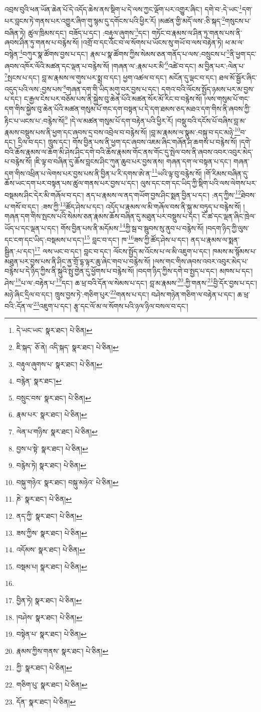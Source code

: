 འབྲས་བུའི་ཕན་ཡོན་ཆེན་པོ་དེ་འདོད་ཆེས་ནས་སྡིག་པ་དེ་ལས་ཀྱང་ལྡོག་པར་འགྱུར་ཞིང་། དགེ་བ་:དེ་ཡང་\footnote{དེ་ཡང་ཡང་  སྣར་ཐང་།  པེ་ཅིན། }དག་པར་བླངས་ཏེ་གནས་པར་འགྱུར་ཞིག་གུ་སྙམ་དུ་དགོངས་པའི་ཕྱིར་རོ། །མཚན་གྱི་མདོ་ལས་:ཅི་སྐད་\footnote{ཇི་སྐད་  ཅོ་ནེ། འདི་སྐད་  སྣར་ཐང་།  པེ་ཅིན། }གསུངས་པ་བཞིན་ཏེ། ཚུལ་ཁྲིམས་དང་། བཟོད་པ་དང་། :བརྟུལ་ཞུགས་\footnote{བརྟུལ་ཞུགས་པ་  སྣར་ཐང་།  པེ་ཅིན། }དང་། གཏོང་བ་རྣམས་ལ་ཤིན་ཏུ་གནས་པས་ནི་ཞབས་ཤིན་ཏུ་གནས་པ་བརྙེས་སོ། །འགྲོ་བ་དང་འོང་བ་ལ་སོགས་པ་ཡོངས་སུ་གཡོ་བ་ལས་བརྟེན་ཏེ། ཕ་མ་ལ་བསྙེན་\footnote{བརྙེན་  སྣར་ཐང་། }བཀུར་སྣ་ཚོགས་བྱས་པ་དང་། རྣམ་པ་སྣ་ཚོགས་ཀྱིས་སེམས་ཅན་གནོད་པ་ལས་:བསྲུངས་པ་\footnote{བསྲུང་བས་  སྣར་ཐང་།  པེ་ཅིན། }ནི་ཕྱག་དང་ཞབས་འཁོར་ལོའི་མཚན་དང་ལྡན་པ་བརྙེས་སོ། །གཞན་ལ་:རྣམ་པར་མི་\footnote{རྣམ་པར་  སྣར་ཐང་།  པེ་ཅིན། }འཚེ་བ་དང་། མ་བྱིན་པར་:ལེན་པ་\footnote{ལེན་པ་གཉིས་  སྣར་ཐང་།  པེ་ཅིན། }སྤངས་པ་དང་། བླ་མ་རྣམས་ལ་གུས་པར་སྨྲ་བ་དང་། ཕྱག་འཚལ་བ་དང་། མངོན་དུ་ལྡང་བ་དང་། ཐལ་མོ་སྦྱོར་ཞིང་འདུད་པའི་ལས་:བྱས་པས་\footnote{བྱས་པ་སྟེ་  སྣར་ཐང་།  པེ་ཅིན། }གཞན་དག་གི་ཡིད་མགུ་བར་བྱས་པ་དང་། དགའ་བའི་ལོངས་སྤྱོད་ཉམས་པར་མ་བྱས་པ་དང་། ང་རྒྱལ་ངེས་པར་བཅོམ་པས་ནི་སྐྱེས་བུ་ཆེན་པོའི་མཚན་སོར་མོ་རིང་བ་བརྙེས་སོ། །ལས་གསུམ་པོ་གང་དག་གིས་སྐྱེས་བུ་ཆེན་པོའི་མཚན་གསུམ་པོ་གང་དག་བསྟན་པ་དེ་དག་ཐམས་ཅད་མཐའ་དག་གིས་ནི་ཞབས་ཀྱི་རྟིང་པ་ཡངས་པ་:བརྙེས་སོ།\footnote{བརྙེས་ཏེ།  སྣར་ཐང་།  པེ་ཅིན། } །དེ་ལ་མཚན་གསུམ་པོ་དག་བརྟེན་པའི་ཕྱིར་རོ། །བསྡུ་བའི་དངོས་པོ་བཞིས་བླ་མ་རྣམས་བསྡུས་པས་ནི་ཕྱག་དང་ཞབས་དྲ་བས་འབྲེལ་བ་བརྙེས་སོ། །བླ་མ་རྣམས་ལ་སྣུམ་:བསྐུ་བ་དང་མཉེ་\footnote{བསྐུ་གཉེའ་  སྣར་ཐང་། བསྐུ་མཉེའ་  པེ་ཅིན། }བ་དང་། དྲིལ་བ་དང་། ཁྲུས་དང་། གོས་བྱིན་པས་ནི་ཕྱག་དང་ཞབས་འཇམ་ཞིང་གཞོན་ཤ་ཆགས་པ་བརྙེས་སོ། །དགེ་བའི་ཆོས་རྣམས་ལ་ཆོག་མི་ཤེས་ཤིང་དགེ་བའི་ཆོས་རྣམས་གོང་ནས་གོང་དུ་སྤེལ་བས་ནི་ཞབས་འབར་འབུར་མེད་པ་བརྙེས་སོ། །ཇི་ལྟ་བ་བཞིན་དུ་ཆོས་བླངས་ཤིང་ཀུན་ཆུབ་པར་བྱས་ནས། གཞན་དག་ལ་བསྟན་པ་དང་། གཞན་དག་གིས་འཕྲིན་པ་ལེགས་པར་བྱས་པས་ནི་བྱིན་པ་རི་དགས་ཨེ་ན་\footnote{ཎེ་  སྣར་ཐང་།  པེ་ཅིན། }ཡའི་ལྟ་བུ་བརྙེས་སོ། །གོ་རིམས་བཞིན་དུ་ཆོས་ཡང་དག་པར་བསྟན་པས་ཚུལ་གནས་པར་བྱས་པ་དང་། ལུས་དང་ངག་དང་ཡིད་ཀྱི་སྡིག་པའི་ལས་ལེགས་པར་བསྡམས་ཤིང་དེར་མི་གཞོལ་བ་དང་། ནད་པ་རྣམས་ལ་ནད་གཡོག་བྱས་ཤིང་སྨན་བྱིན་པ་དང་། :ནད་ཀྱིས་\footnote{ནད་ཀྱི་  སྣར་ཐང་།  པེ་ཅིན། }ཐེབས་པ་གསོ་བ་དང་། :ཟས་ཀྱི་\footnote{ཟས་ཀྱིས་  སྣར་ཐང་།  པེ་ཅིན། }ཚོད་ཤེས་པ་དང་། འདོད་པ་རྣམས་ལ་མི་གཞོལ་བས་ནི་སྐུ་མ་བཏུད་པ་བརྙེས་སོ། །གཞན་དག་གིས་སྤངས་པའི་སེམས་ཅན་རྣམས་ཆོས་བཞིན་དུ་མཐུན་པར་བསྡུས་པ་དང་། ངོ་ཚ་དང་ལྡན་ཞིང་ཁྲེལ་ཡོད་པ་དང་ལྡན་པ་དང་། གོས་བྱིན་པས་ནི་མདོམས་\footnote{འདོམས་  སྣར་ཐང་།  པེ་ཅིན། }ཀྱི་སྦ་བ་སྦུབས་སུ་ནུབ་པ་བརྙེས་སོ། །བདག་ཉིད་ཀྱི་ལུས་དང་ངག་དང་ཡིད་:བསྡམས་པ་དང་།\footnote{བསྡམ་པ།  སྣར་ཐང་།  པེ་ཅིན། } བླང་བ་དང་། ཁ་\footnote{}ཟས་ཀྱི་ཚོད་ཤེས་པ་དང་། ནད་པ་རྣམས་ལ་སྨན་སྦྱིན་:པ་དང་།\footnote{བྱིན་ཏེ།  སྣར་ཐང་།  པེ་ཅིན། } ལས་ཡང་བ་དང་། བླང་བ་དང་། ལོངས་སྤྱོད་མ་འོངས་པ་ལ་མི་འཇུག་པ་དང་། ཁམས་མ་སྙོམས་པ་མཐུན་པར་བྱས་པས་ནི་ཤིང་ནྱ་གྲོ་དྷ་ལྟར་ཆུ་ཞེང་གབ་པ་བརྙེས་སོ། །ལས་གང་གིས་ཞབས་འབར་འབུར་མེད་པ་བརྙེས་པ་དེ་ཉིད་ཀྱིས་ནི་སྐུའི་སྤུ་གྱེན་དུ་ཕྱོགས་པ་བརྙེས་སོ། །བདག་ཉིད་ཀྱིས་དགེ་བ་སྤྱད་པ་དང་། མཁས་པ་དང་། ཤེས་\footnote{།བཤེས་  སྣར་ཐང་།  པེ་ཅིན། }པ་ལ་:བརྟེན་པ་\footnote{བསྟེན་པ་  སྣར་ཐང་།  པེ་ཅིན། }དང་། ཆ་ཕྲ་བའི་དོན་ལ་སེམས་པ་དང་། བླ་མ་རྣམས་\footnote{རྣམས་ཀྱིས་གནས་  སྣར་ཐང་།  པེ་ཅིན། }:ཀྱི་གནས་\footnote{ཀྱི་  སྣར་ཐང་།  པེ་ཅིན། }བྱི་དོར་བྱས་པ་དང་། མཉེ་ཞིང་དྲིལ་བ་དང་། ཁྲུས་བྱས་ཏེ་:གཅིག་པུར་\footnote{གཅིག་པུ་  སྣར་ཐང་།  པེ་ཅིན། }གནས་པ་དང་། བཤེས་གཉེན་གཅིག་ལ་བརྟེན་པ་དང་། ཆ་ཕྲ་བའི་:དོན་ལ་\footnote{དོན་  སྣར་ཐང་།  པེ་ཅིན། }འཇུག་པ་དང་། རྩྭ་དང་ལོ་མ་ལ་སོགས་པའི་ཉལ་ཉིལ་བསལ་བ་དང་། 